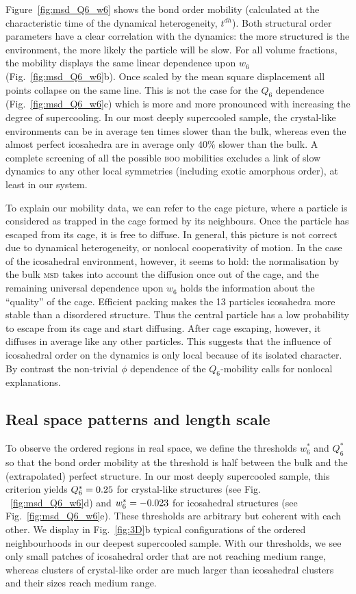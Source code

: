 Figure~\ref{fig:msd_Q6_w6} shows the bond order mobility (calculated at the characteristic time of the dynamical heterogeneity, $t^{dh}$). Both structural order parameters have a clear correlation with the dynamics: the more structured is the environment, the more likely the particle will be slow. For all volume fractions, the mobility displays the same linear dependence upon $w_6$ (Fig.~\ref{fig:msd_Q6_w6}b). Once scaled by the mean square displacement all points collapse on the same line. This is not the case for the $Q_6$ dependence (Fig.~\ref{fig:msd_Q6_w6}c) which is more and more pronounced with increasing the degree of supercooling. In our most deeply supercooled sample, the crystal-like environments can be in average ten times slower than the bulk, whereas even the almost perfect icosahedra are in average only $40\%$ slower than the bulk. A complete screening of all the possible \textsc{boo} mobilities excludes a link of slow dynamics to any other local symmetries (including exotic amorphous order), at least in our system.

To explain our mobility data, we can refer to the cage picture, where a particle is considered as trapped in the cage formed by its neighbours. Once the particle has escaped from its cage, it is free to diffuse. In general, this picture is not correct due to dynamical heterogeneity, or nonlocal cooperativity of motion. In the case of the icosahedral environment, however, it seems to hold: the normalisation by the bulk \textsc{msd} takes into account the diffusion once out of the cage, and the remaining universal dependence upon $w_6$ holds the information about the ``quality'' of the cage. Efficient packing makes the 13 particles icosahedra more stable than a disordered structure. Thus the central particle has a low probability to escape from its cage and start diffusing. After cage escaping, however, it diffuses in average like any other particles. This suggests that the influence of icosahedral order on the dynamics is only local because of its isolated character. By contrast the non-trivial $\phi$ dependence of the $Q_6$-mobility calls for nonlocal explanations.

\subsection*{Real space patterns and length scale}
To observe the ordered regions in real space, we define the thresholds $w_6^*$ and $Q_6^*$ so that the bond order mobility at the threshold is half between the bulk and the (extrapolated) perfect structure. In our most deeply supercooled sample, this criterion yields $Q_6^* = 0.25$ for crystal-like structures (see Fig. ~\ref{fig:msd_Q6_w6}d) and $w_6^* = -0.023$ for icosahedral structures (see Fig.~\ref{fig:msd_Q6_w6}e). These thresholds are arbitrary but coherent with each other. We display in Fig.~\ref{fig:3D}b typical configurations of the ordered neighbourhoods in our deepest supercooled sample. With our thresholds, we see only small patches of icosahedral order that are not reaching medium range, whereas clusters of crystal-like order are much larger than icosahedral clusters and their sizes reach medium range. 

